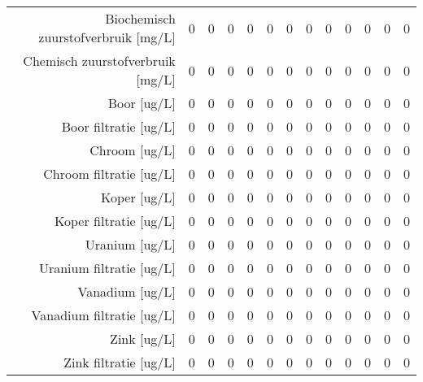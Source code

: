 \begin{tabular}{ r |c | c | c | c | c |c | c | c | c | c | c | c }
Biochemisch zuurstofverbruik [mg/L] &0 & 0 & 0 & 0 & 0 & 0 & 0 & 0 & 0 & 0 & 0 & 0 \\
Chemisch zuurstofverbruik [mg/L] &0 & 0 & 0 & 0 & 0 & 0 & 0 & 0 & 0 & 0 & 0 & 0 \\
Boor [ug/L] &0 & 0 & 0 & 0 & 0 & 0 & 0 & 0 & 0 & 0 & 0 & 0 \\
Boor filtratie [ug/L] &0 & 0 & 0 & 0 & 0 & 0 & 0 & 0 & 0 & 0 & 0 & 0 \\
Chroom [ug/L] &0 & 0 & 0 & 0 & 0 & 0 & 0 & 0 & 0 & 0 & 0 & 0 \\
Chroom filtratie [ug/L] &0 & 0 & 0 & 0 & 0 & 0 & 0 & 0 & 0 & 0 & 0 & 0 \\
Koper [ug/L] &0 & 0 & 0 & 0 & 0 & 0 & 0 & 0 & 0 & 0 & 0 & 0 \\
Koper filtratie [ug/L] &0 & 0 & 0 & 0 & 0 & 0 & 0 & 0 & 0 & 0 & 0 & 0 \\
Uranium [ug/L] &0 & 0 & 0 & 0 & 0 & 0 & 0 & 0 & 0 & 0 & 0 & 0 \\
Uranium filtratie [ug/L] &0 & 0 & 0 & 0 & 0 & 0 & 0 & 0 & 0 & 0 & 0 & 0 \\
Vanadium [ug/L] &0 & 0 & 0 & 0 & 0 & 0 & 0 & 0 & 0 & 0 & 0 & 0 \\
Vanadium filtratie [ug/L] &0 & 0 & 0 & 0 & 0 & 0 & 0 & 0 & 0 & 0 & 0 & 0 \\
Zink [ug/L] &0 & 0 & 0 & 0 & 0 & 0 & 0 & 0 & 0 & 0 & 0 & 0 \\
Zink filtratie [ug/L] &0 & 0 & 0 & 0 & 0 & 0 & 0 & 0 & 0 & 0 & 0 & 0 \\
\end{tabular}    
